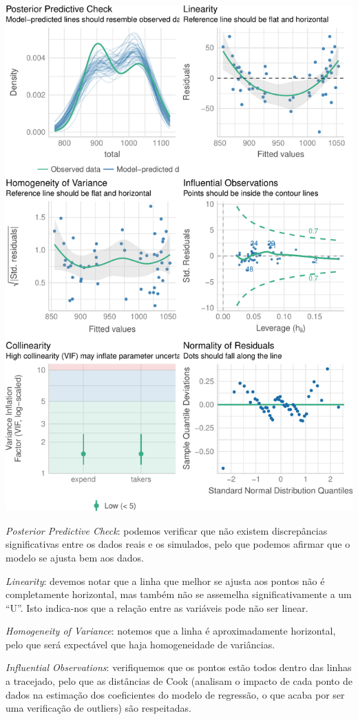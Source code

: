 \documentclass[]{article}
\begin{document}
\includegraphics{AEII_main_files/figure-latex/unnamed-chunk-39-1.pdf}

\emph{Posterior Predictive Check}: podemos verificar que não existem
discrepâncias significativas entre os dados reais e os simulados, pelo
que podemos afirmar que o modelo se ajusta bem aos dados.

\emph{Linearity}: devemos notar que a linha que melhor se ajusta aos
pontos não é completamente horizontal, mas também não se assemelha
significativamente a um ``U''. Isto indica-nos que a relação entre as
variáveis pode não ser linear.

\emph{Homogeneity of Variance}: notemos que a linha é aproximadamente
horizontal, pelo que será expectável que haja homogeneidade de
variâncias.

\emph{Influential Observations}: verifiquemos que os pontos estão todos
dentro das linhas a tracejado, pelo que as distâncias de Cook (analisam
o impacto de cada ponto de dados na estimação dos coeficientes do modelo
de regressão, o que acaba por ser uma verificação de outliers) são
respeitadas.
\end{document}
